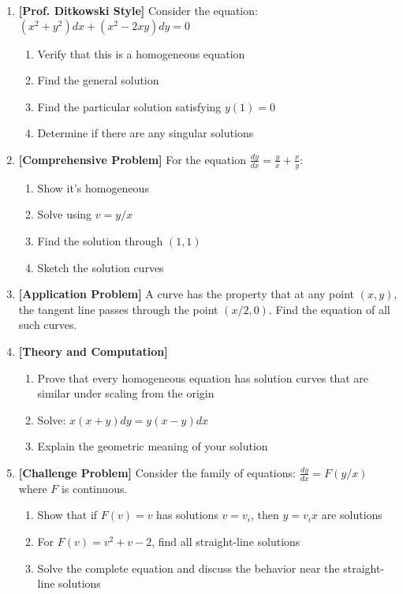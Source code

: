 \documentclass[12pt]{article}
\begin{document}
\begin{enumerate}[resume]
    \item \textbf{[Prof. Ditkowski Style]}
    Consider the equation: $(x^2 + y^2)dx + (x^2 - 2xy)dy = 0$
    \begin{enumerate}
        \item Verify that this is a homogeneous equation
        \item Find the general solution
        \item Find the particular solution satisfying $y(1) = 0$
        \item Determine if there are any singular solutions
    \end{enumerate}

    \item \textbf{[Comprehensive Problem]}
    For the equation $\frac{dy}{dx} = \frac{y}{x} + \frac{x}{y}$:
    \begin{enumerate}
        \item Show it's homogeneous
        \item Solve using $v = y/x$
        \item Find the solution through $(1, 1)$
        \item Sketch the solution curves
    \end{enumerate}

    \item \textbf{[Application Problem]}
    A curve has the property that at any point $(x, y)$, the tangent line passes through the point $(x/2, 0)$. Find the equation of all such curves.

    \item \textbf{[Theory and Computation]}
    \begin{enumerate}
        \item Prove that every homogeneous equation has solution curves that are similar under scaling from the origin
        \item Solve: $x(x + y)dy = y(x - y)dx$
        \item Explain the geometric meaning of your solution
    \end{enumerate}

    \item \textbf{[Challenge Problem]}
    Consider the family of equations: $\frac{dy}{dx} = F(y/x)$ where $F$ is continuous.
    \begin{enumerate}
        \item Show that if $F(v) = v$ has solutions $v = v_i$, then $y = v_i x$ are solutions
        \item For $F(v) = v^2 + v - 2$, find all straight-line solutions
        \item Solve the complete equation and discuss the behavior near the straight-line solutions
    \end{enumerate}
\end{enumerate}
\end{document}
